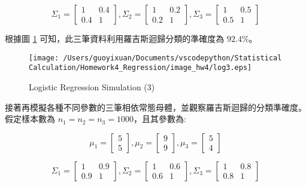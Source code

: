 $$ \Sigma_1 = \left[
            \begin{array}{clr}
                1 & 0.4  \\
                0.4 & 1
            \end{array} \right] ,
            \Sigma_2 = \left[
            \begin{array}{clr}
                1 & 0.2  \\
                0.2 & 1 
            \end{array} \right] ,
            \Sigma_3 = \left[
            \begin{array}{clr}
                1 & 0.5  \\
                0.5 & 1 
            \end{array} \right] $$       

根據圖 \ref{fig:log3} 可知，此三筆資料利用羅吉斯迴歸分類的準確度為 $92.4\%$。 
            
\begin{figure}[H]
    \centering
        \texttt{[image: /Users/guoyixuan/Documents/vscodepython/Statistical Calculation/Homework4\_Regression/image\_hw4/log3.eps]}
    \caption{Logistic Regression Simulation (3)}
    \label{fig:log3}
\end{figure}

接著再模擬各種不同參數的三筆相依常態母體，並觀察羅吉斯迴歸的分類準確度。假定樣本數為 $n_1=n_2=n_3=1000$，且其參數為:

$$ \mu_1 = \left[
            \begin{array}{clr}
                5  \\
                5 
            \end{array} \right] ,
            \mu_2 = \left[
            \begin{array}{clr}
                9  \\
                9 
            \end{array} \right] ,
            \mu_3 = \left[
            \begin{array}{clr}
                5  \\
                4 
            \end{array} \right] $$ 
            
$$ \Sigma_1 = \left[
            \begin{array}{clr}
                1 & 0.9  \\
                0.9 & 1
            \end{array} \right] ,
            \Sigma_2 = \left[
            \begin{array}{clr}
                1 & 0.6  \\
                0.6 & 1 
            \end{array} \right] ,
            \Sigma_3 = \left[
            \begin{array}{clr}
                1 & 0.8  \\
                0.8 & 1 
            \end{array} \right] $$       

